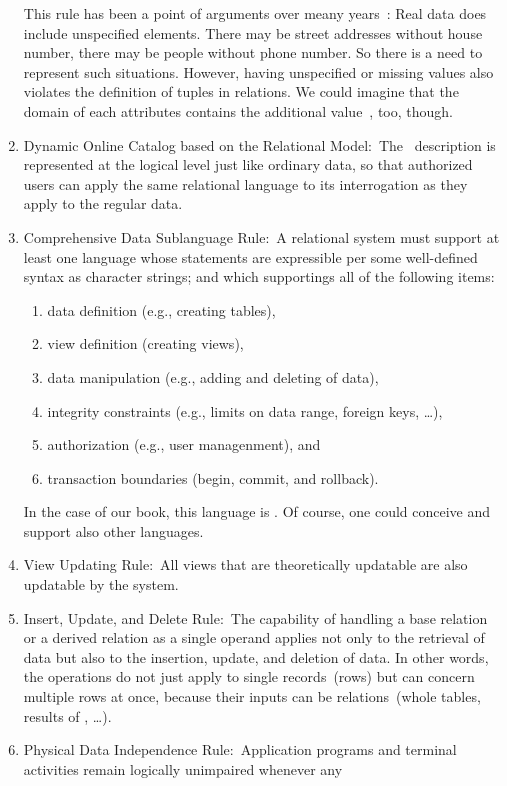 \begin{enumerate}
This rule has been a point of arguments over meany years~\cite{C20245YOQ}:
Real data does include unspecified elements.
There may be street addresses without house number, there may be people without phone number.
So there is a need to represent such situations.
However, having unspecified or missing values also violates the definition of tuples in relations.
We could imagine that the domain of each attributes contains the additional value~, too, though.%
%
\item Dynamic Online Catalog based on the Relational Model:~The \db\ description is represented at the logical level just like ordinary data, so that authorized users can apply the same relational language to its interrogation as they apply to the regular data.%
%
\item Comprehensive Data Sublanguage Rule:~A relational system must support at least one language whose statements are expressible per some well-defined syntax as character strings; and which supportings all of the following items:%
\begin{enumerate}%
\item data definition (e.g., creating tables),%
\item view definition (creating views),%
\item data manipulation (e.g., adding and deleting of data),%
\item integrity constraints (e.g., limits on data range, foreign keys, \dots),%
\item authorization (e.g., user managenment), and%
\item transaction boundaries (begin, commit, and rollback).%
\end{enumerate}
In the case of our book, this language is \sql.
Of course, one could conceive and support also other languages.%
%
\item View Updating Rule:~All views that are theoretically updatable are also updatable by the system.%
%
\item Insert, Update, and Delete Rule:~The capability of handling a base relation or a derived relation as a single operand applies not only to the retrieval of data but also to the insertion, update, and deletion of data.
In other words, the operations do not just apply to single records~(rows) but can concern multiple rows at once, because their inputs can be relations~(whole tables, results of , \dots).%
%
\item Physical Data Independence Rule:~Application programs and terminal activities remain logically unimpaired whenever any

\end{enumerate}
